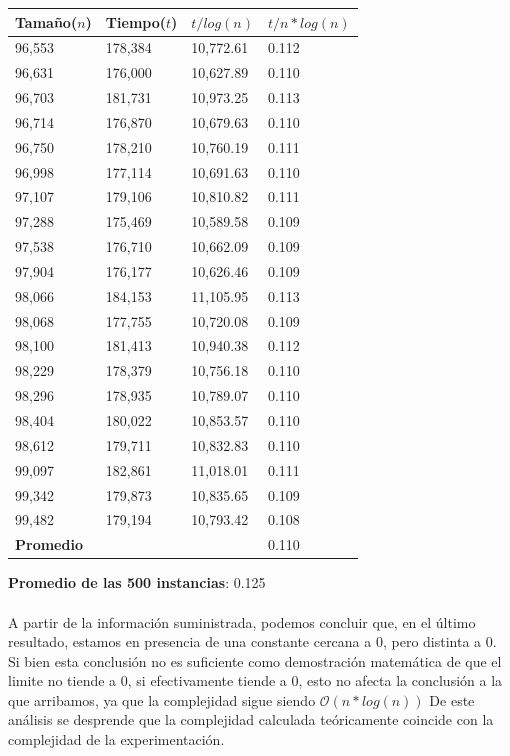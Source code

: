 \begin{table}[H]
\parbox{0.3\textwidth}{
    \begin{tabular}{ | l | l |l | l |}
    \hline
	Tamaño($n$) & Tiempo($t$) & \textbf{$t / log(n)$} & \textbf{$t / n*log(n)$} \\ \hline
96,553	&	178,384	&	10,772.61	&	0.112	\\ \hline
96,631	&	176,000	&	10,627.89	&	0.110	\\ \hline
96,703	&	181,731	&	10,973.25	&	0.113	\\ \hline
96,714	&	176,870	&	10,679.63	&	0.110	\\ \hline
96,750	&	178,210	&	10,760.19	&	0.111	\\ \hline
96,998	&	177,114	&	10,691.63	&	0.110	\\ \hline
97,107	&	179,106	&	10,810.82	&	0.111	\\ \hline
97,288	&	175,469	&	10,589.58	&	0.109	\\ \hline
97,538	&	176,710	&	10,662.09	&	0.109	\\ \hline
97,904	&	176,177	&	10,626.46	&	0.109	\\ \hline
98,066	&	184,153	&	11,105.95	&	0.113	\\ \hline
98,068	&	177,755	&	10,720.08	&	0.109	\\ \hline
98,100	&	181,413	&	10,940.38	&	0.112	\\ \hline
98,229	&	178,379	&	10,756.18	&	0.110	\\ \hline
98,296	&	178,935	&	10,789.07	&	0.110	\\ \hline
98,404	&	180,022	&	10,853.57	&	0.110	\\ \hline
98,612	&	179,711	&	10,832.83	&	0.110	\\ \hline
99,097	&	182,861	&	11,018.01	&	0.111	\\ \hline
99,342	&	179,873	&	10,835.65	&	0.109	\\ \hline
99,482	&	179,194	&	10,793.42	&	0.108	\\ \hline
    \textbf{Promedio} & & & 0.110 \\ \hline

    \end{tabular}
}
\end{table}

\textbf{Promedio de las 500 instancias}: 0.125
\\
\\
A partir de la información suministrada, podemos concluir que, en el último resultado, estamos en presencia de una constante cercana a 0, pero distinta a 0. Si bien esta conclusión no es suficiente como demostración matemática de que el limite no tiende a 0, si efectivamente tiende a 0, esto no afecta la conclusión a la que arribamos, ya que la complejidad sigue siendo $\mathcal{O}(n*log(n))$
De este análisis se desprende que la complejidad calculada teóricamente coincide con la complejidad de la experimentación.


